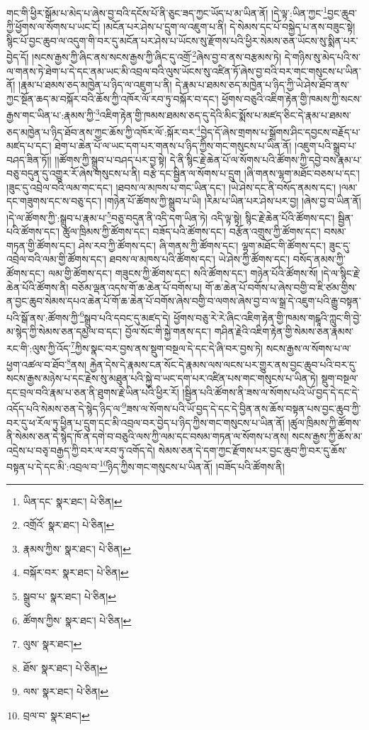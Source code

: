གང་གི་ཕྱིར་སྒོམ་པ་མེད་པ་ཞེས་བྱ་བའི་དངོས་པོ་ནི་ཅུང་ཟད་ཀྱང་ཡོད་པ་མ་ཡིན་ནོ། །དེ་ལྟ་:ཡིན་ཀྱང་\footnote{ཡིན་དང་  སྣར་ཐང་།  པེ་ཅིན། }བྱང་ཆུབ་ཀྱི་ཕྱོགས་ལ་སོགས་པ་ཡང་ངོ། །མངོན་པར་ཤེས་པ་དྲུག་ལ་འཇུག་པ་ནི། དེ་སེམས་དང་པོ་བསྐྱེད་པ་ནས་བཟུང་སྟེ། སྙིང་པོ་བྱང་ཆུབ་ལ་འདུག་གི་བར་དུ་མངོན་པར་ཤེས་པ་ཡོངས་སུ་རྫོགས་པའི་ཕྱིར་སེམས་ཅན་ཡོངས་སུ་སྨིན་པར་བྱེད་དོ། །སངས་རྒྱས་ཀྱི་ཞིང་ནས་སངས་རྒྱས་ཀྱི་ཞིང་དུ་འགྲོ་\footnote{འགྲོའོ་  སྣར་ཐང་།  པེ་ཅིན། }ཞེས་བྱ་བ་ནས་བརྩམས་ཏེ། དེ་གཉིས་སུ་མེད་པའི་ས་ལ་གནས་ཏེ་ཐེག་པ་དེ་དང་ནམ་ཡང་མི་འབྲལ་བའི་ལུས་ཡོངས་སུ་འཛིན་ཏོ་ཞེས་བྱ་བའི་བར་གང་གསུངས་པ་ཡིན་ནོ། །རྣམ་པ་ཐམས་ཅད་མཁྱེན་པ་ཉིད་ལ་འཇུག་པ་ནི། དེ་རྣམ་པ་ཐམས་ཅད་མཁྱེན་པ་ཉིད་ཀྱི་ཡེ་ཤེས་ཐོབ་ནས་ཀྱང་སྔོན་ཆད་མ་བསྐོར་བའི་ཆོས་ཀྱི་འཁོར་ལོ་རབ་ཏུ་བསྐོར་བ་དང་། ཕྱོགས་བཅུའི་འཇིག་རྟེན་གྱི་ཁམས་ཀྱི་སངས་རྒྱས་གང་ཡིན་པ་:རྣམས་ཀྱི་\footnote{རྣམས་ཀྱིས་  སྣར་ཐང་།  པེ་ཅིན། }འཇིག་རྟེན་གྱི་ཁམས་ཐམས་ཅད་དུ་དེའི་མིང་སྨོས་པ་མཛད་ཅིང་དེ་རྣམ་པ་ཐམས་ཅད་མཁྱེན་པ་ཉིད་ཐོབ་ནས་ཀྱང་ཆོས་ཀྱི་འཁོར་ལོ་:སྐོར་བར་\footnote{བསྐོར་བར་  སྣར་ཐང་།  པེ་ཅིན། }བྱེད་དོ་ཞེས་གྲགས་པ་སྒྲོགས་ཤིང་དབྱངས་བརྗོད་པ་མཛད་པ་དང་། ཐེག་པ་ཆེན་པོ་ལ་ཡང་དག་པར་གནས་པ་ཉིད་ཀྱིས་གང་གསུངས་པ་ཡིན་ནོ། །འཇུག་པའི་སྒྲུབ་པ་བཤད་ཟིན་ཏོ།། །།ཚོགས་ཀྱི་སྒྲུབ་པ་བཤད་པར་བྱ་སྟེ། དེ་ནི་སྙིང་རྗེ་ཆེན་པོ་ལ་སོགས་པའི་ཚོགས་ཀྱི་དབྱེ་བས་རྣམ་པ་བཅུ་བདུན་དུ་འགྱུར་རོ་ཞེས་གསུངས་པ་ནི། བརྩེ་དང་སྦྱིན་ལ་སོགས་པ་དྲུག །ཞི་གནས་ལྷག་མཐོང་བཅས་པ་དང་། །ཟུང་དུ་འབྲེལ་བའི་ལམ་གང་དང་། །ཐབས་ལ་མཁས་པ་གང་ཡིན་དང་། །ཡེ་ཤེས་དང་ནི་བསོད་ནམས་དང་། །ལམ་དང་གཟུགས་དང་ས་བཅུ་དང་། །གཉེན་པོ་ཚོགས་ཀྱི་སྒྲུབ་པ་ཡི། །རིམ་པ་ཡིན་པར་ཤེས་པར་བྱ། །ཞེས་བྱ་བ་ཡིན་ནོ། །དེ་ལ་ཚོགས་ཀྱི་:སྒྲུབ་པ་རྣམ་པ་\footnote{སྒྲུབ་པ་  སྣར་ཐང་།  པེ་ཅིན། }བཅུ་བདུན་ནི་འདི་དག་ཡིན་ཏེ། འདི་ལྟ་སྟེ། སྙིང་རྗེ་ཆེན་པོའི་ཚོགས་དང་། སྦྱིན་པའི་ཚོགས་དང་། ཚུལ་ཁྲིམས་ཀྱི་ཚོགས་དང་། བཟོད་པའི་ཚོགས་དང་། བརྩོན་འགྲུས་ཀྱི་ཚོགས་དང་། བསམ་གཏན་གྱི་ཚོགས་དང་། ཤེས་རབ་ཀྱི་ཚོགས་དང་། ཞི་གནས་ཀྱི་ཚོགས་དང་། ལྷག་མཐོང་གི་ཚོགས་དང་། ཟུང་དུ་འབྲེལ་བའི་ལམ་གྱི་ཚོགས་དང་། ཐབས་ལ་མཁས་པའི་ཚོགས་དང་། ཡེ་ཤེས་ཀྱི་ཚོགས་དང་། བསོད་ནམས་ཀྱི་ཚོགས་དང་། ལམ་གྱི་ཚོགས་དང་། གཟུངས་ཀྱི་ཚོགས་དང་། སའི་ཚོགས་དང་། གཉེན་པོའི་ཚོགས་སོ། །དེ་ལ་སྙིང་རྗེ་ཆེན་པོའི་ཚོགས་ནི། བཅོམ་ལྡན་འདས་གོ་ཆ་ཆེན་པོ་བགོས་པ། གོ་ཆ་ཆེན་པོ་བགོས་པ་ཞེས་བགྱི་བ་ཇི་ཙམ་གྱིས་ན་བྱང་ཆུབ་སེམས་དཔའ་ཆེན་པོ་གོ་ཆ་ཆེན་པོ་བགོས་ཞེས་བགྱི་བ་ལགས་ཞེས་བྱ་བ་ལ་སྒྲ་དེ་འཇུག་པའི་རྒྱུ་བསྟན་པའི་སྒོ་ནས་:ཚོགས་ཀྱི་\footnote{ཚོགས་ཀྱིས་  སྣར་ཐང་།  པེ་ཅིན། }སྒྲུབ་པའི་དབང་དུ་མཛད་དེ། ཕྱོགས་བཅུ་རེ་རེ་ཞིང་འཇིག་རྟེན་གྱི་ཁམས་གངྒཱའི་ཀླུང་གི་བྱེ་མ་སྙེད་ཀྱི་སེམས་ཅན་དམྱལ་བ་དང་། བྱོལ་སོང་གི་སྐྱེ་གནས་དང་། གཤིན་རྗེའི་འཇིག་རྟེན་གྱི་སེམས་ཅན་རྣམས་རང་གི་:ལུས་ཀྱི་འོད་\footnote{ལུས་  སྣར་ཐང་། }ཀྱིས་སྣང་བར་བྱས་ནས་སྡུག་བསྔལ་དེ་དང་དེ་ཞི་བར་བྱས་ཏེ། སངས་རྒྱས་ལ་སོགས་པ་ལ་ཕྱག་འཚལ་བ་ཐོབ་\footnote{ཐོས་  སྣར་ཐང་།  པེ་ཅིན། }ནས། རྐྱེན་དེས་དེ་རྣམས་ངན་སོང་དེ་རྣམས་ལས་ལངས་པར་གྱུར་ནས་བྱང་ཆུབ་པའི་བར་དུ་སངས་རྒྱས་མཉེས་པ་དང་རྗེས་སུ་མཐུན་པའི་སྐྱེ་བ་ཡང་དག་པར་འཛིན་པས་གང་གསུངས་པ་ཡིན་ཏེ། སྡུག་བསྔལ་དང་བྲལ་བའི་རྣམ་པ་ཅན་ནི་ཐུགས་རྗེ་ཡིན་པའི་ཕྱིར་རོ། །སྦྱིན་པའི་ཚོགས་ནི་ཟས་ལ་སོགས་པའི་ཡོ་བྱད་དེ་དང་དེ་འདོད་པའི་སེམས་ཅན་དེ་སྙེད་ཉིད་ལ་\footnote{ལས་  སྣར་ཐང་།  པེ་ཅིན། }ཟས་ལ་སོགས་པའི་ཡོ་བྱད་དེ་དང་དེ་བྱིན་ནས་ཆོས་བསྟན་པས་བྱང་ཆུབ་ཀྱི་བར་དུ་ཕ་རོལ་ཏུ་ཕྱིན་པ་དྲུག་དང་མི་འབྲལ་བར་བྱེད་པ་ཉིད་ཀྱིས་གང་གསུངས་པ་ཡིན་ནོ། །ཚུལ་ཁྲིམས་ཀྱི་ཚོགས་ནི་སེམས་ཅན་དེ་སྙེད་ཁོ་ན་དགེ་བ་བཅུའི་ལས་ཀྱི་ལམ་དང་བསམ་གཏན་ལ་སོགས་པ་ནས། སངས་རྒྱས་ཀྱི་ཆོས་མ་འདྲེས་པ་བཅྭ་བརྒྱད་ཀྱི་བར་ལ་རབ་ཏུ་འགོད་དེ། སེམས་ཅན་དེ་དག་ཀྱང་རྫོགས་པར་བྱང་ཆུབ་ཀྱི་བར་དུ་ཆོས་བསྟན་པ་དེ་དང་མི་:འབྲལ་བ་\footnote{བྲལ་བ་  སྣར་ཐང་། }ཉིད་ཀྱིས་གང་གསུངས་པ་ཡིན་ནོ། །བཟོད་པའི་ཚོགས་ནི། 